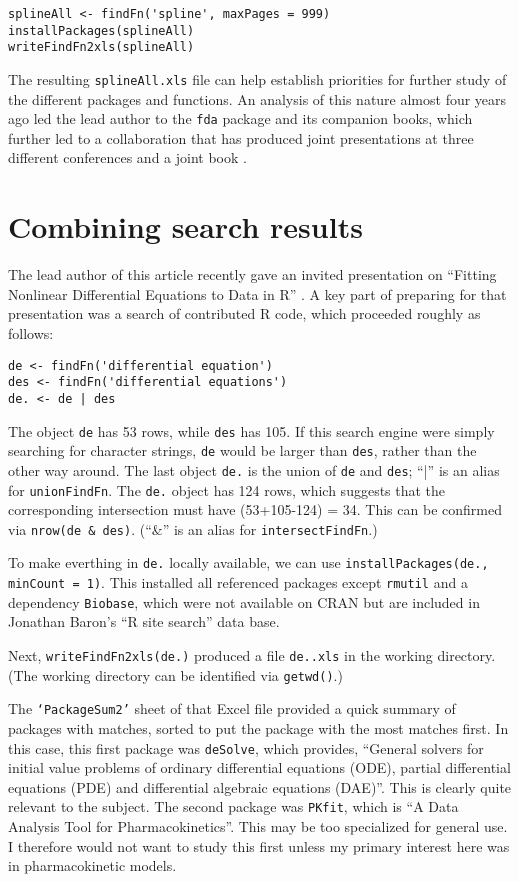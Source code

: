 \begin{verbatim}
splineAll <- findFn('spline', maxPages = 999)
installPackages(splineAll)
writeFindFn2xls(splineAll)
\end{verbatim}

The resulting {\tt splineAll.xls} file can help establish priorities
for further study of the different packages and functions.  An
analysis of this nature almost four years ago led the lead author
to the {\tt fda} package and its companion books, which further
led to a collaboration that has produced joint presentations at
three different conferences and a joint book \citep{RHG09}.


\section{Combining search results}

The lead author of this article recently gave an invited presentation
on ``Fitting Nonlinear Differential Equations to Data in R'' \citep{GHR09}.
A key part of preparing for that presentation was a search of
contributed R code, which proceeded roughly as follows:

\begin{verbatim}
de <- findFn('differential equation')
des <- findFn('differential equations')
de. <- de | des
\end{verbatim}

The object {\tt de} has 53 rows, while {\tt des} has 105.
If this search engine were simply searching for character
strings, {\tt de} would be larger than {\tt des}, rather than
the other way around.  The last object {\tt de.} is the union
of {\tt de} and {\tt des};  ``|'' is an alias for {\tt unionFindFn}.
The {\tt de.} object has 124 rows, which suggests that
the corresponding intersection must have (53+105-124) = 34.
This can be confirmed via {\tt nrow(de \& des)}.
(``\&'' is an alias for {\tt intersectFindFn}.)

To make everthing in {\tt de.} locally available, we can use
{\tt installPackages(de., minCount = 1)}.  This installed all
referenced packages except {\tt rmutil} and a dependency {\tt Biobase},
which were not available on CRAN but are included in Jonathan
Baron's ``R site search'' data base.

Next, {\tt writeFindFn2xls(de.)} produced a file {\tt de..xls}
in the working directory.  (The working directory can be
identified via {\tt getwd()}.)

The {\tt `PackageSum2'} sheet of that Excel file provided a quick
summary of packages with matches, sorted to put the package
with the most matches first.  In this case, this first package
was {\tt deSolve}, which provides, ``General solvers for initial
value problems of ordinary differential equations (ODE),
partial differential equations (PDE) and differential
algebraic equations (DAE)''.  This is clearly quite relevant
to the subject.  The second package was {\tt PKfit}, which
is ``A Data Analysis Tool for Pharmacokinetics''.  This may
be too specialized for general use.  I therefore would not
want to study this first unless my primary interest here was in
pharmacokinetic models.


